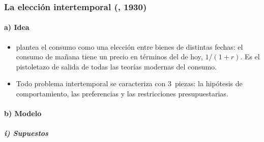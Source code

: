 \documentclass[11pt]{article}
\begin{document}
\subsubsection{La elección intertemporal (, 1930)}\label{sec:fisher}

\paragraph{a) Idea}

\begin{itemize}
\item \textcite{Fisher1930Theory} plantea el consumo como una elección entre bienes de distintas fechas: el consumo de mañana tiene un precio en términos del de hoy, $1/(1+r)$. Es el pistoletazo de salida de todas las teorías modernas del consumo.
\item Todo problema intertemporal se caracteriza con 3~piezas: la hipótesis de comportamiento, las preferencias y las restricciones presupuestarias.
\end{itemize}

\paragraph{b) Modelo}

\subparagraph{i) Supuestos}
\end{document}
